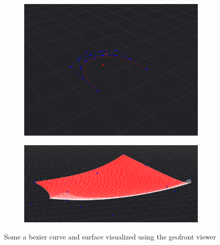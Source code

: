 \begin{figure}
  \centering
  \begin{subfigure}[b]{0.45\linewidth}
    \graphicspath{ {../../assets/images/implementation/} }
    \centering
    \includegraphics[width=\linewidth]{viewer-2.png}
    \caption{}\label{fig:viewer-geometries:1}
  \end{subfigure}%
  \qquad 
  \begin{subfigure}[b]{0.45\linewidth}
    \graphicspath{ {../../assets/images/implementation/} }
    \centering
    \includegraphics[width=\linewidth]{viewer-3.png}
    \caption{}\label{fig:viewer-geometries:2}
  \end{subfigure}%
  \caption[Geofront viewer geometries]{Some a bezier curve and surface visualized using the geofront viewer}
  \label{fig:viewer-geometries}
\end{figure}




